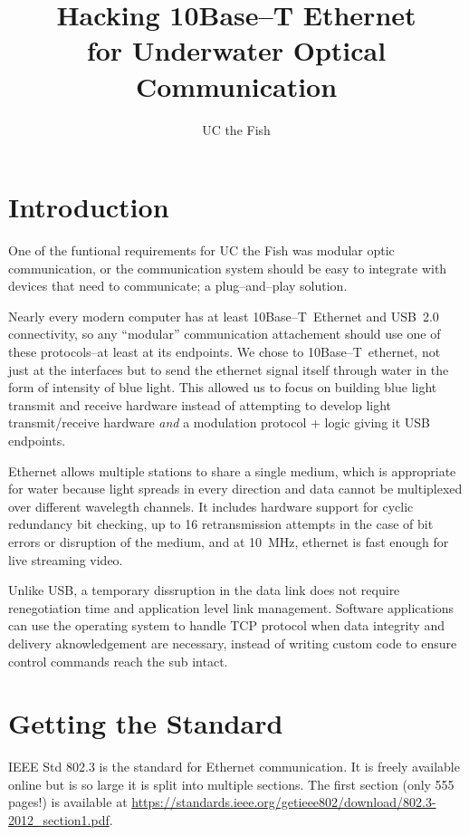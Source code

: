 \documentclass{article}
\begin{document}
\title{Hacking 10Base--T Ethernet\\for Underwater Optical Communication}
\author{UC the Fish}

\maketitle

\section{Introduction}

One of the funtional requirements for UC the Fish was modular optic communication,
or the communication system should be easy to integrate with devices that need to
communicate; a plug--and--play solution.

Nearly every modern computer has at least \mbox{10Base--T Ethernet} and
\mbox{USB 2.0} connectivity, so any ``modular'' communication attachement
should use one of these protocols--at least at its endpoints.
We chose to \mbox{10Base--T ethernet}, not just at the interfaces but to
send the ethernet signal itself through water in the form of intensity
of blue light.
This allowed us to focus on building blue light transmit and receive
hardware instead of attempting to develop light transmit/receive hardware
\textit{and} a modulation protocol + logic giving it USB endpoints.

Ethernet allows multiple stations to share a single medium,
which is appropriate for water because light spreads in every direction
and data cannot be multiplexed over different wavelegth channels. 
It includes hardware support for cyclic redundancy bit checking,
up to 16 retransmission attempts in the case of bit errors or disruption
of the medium, and at \mbox{10 MHz}, ethernet is fast enough 
for live streaming video.

Unlike USB, a temporary dissruption in the data link does not require
renegotiation time and application level link management.
Software applications can use the operating system to handle TCP protocol
when data integrity and delivery aknowledgement are necessary, instead
of writing custom code to ensure control commands reach the sub intact.

\section{Getting the Standard}

IEEE Std 802.3 is the standard for Ethernet communication.
It is freely available online but is so large it is split into multiple
sections.
The first section (only 555 pages!) is available at
\url{https://standards.ieee.org/getieee802/download/802.3-2012\_section1.pdf}.
\end{document}
